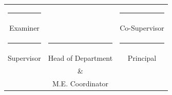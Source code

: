 \begin{center}
\begin{tabular}{ccc}
      \rule{4.0cm}{1sp} & \hspace{0.7in}                & \hspace{0.3in} \rule{4.0cm}{1sp} \\ \vspace{0.6in}
       Examiner & \hspace{1in}             & \hspace{0.3in} Co-Supervisor \\
      \rule{4.0cm}{1sp} & \hspace{0.5in} \rule{4.0cm}{1sp}                  &\hspace{0.45in} \rule{4.0cm}{1sp} \\
     Supervisor & \hspace{0.5in} Head of Department                &\hspace{0.65in} Principal \\\vspace{0.01in}
      & \hspace{0.5in} \&               &\hspace{0.65in}\\\vspace{0.01in}
        & \hspace{0.5in} M.E. Coordinator                &\hspace{0.65in}
    \end{tabular}
\end{center}




%
\cleardoublepage

